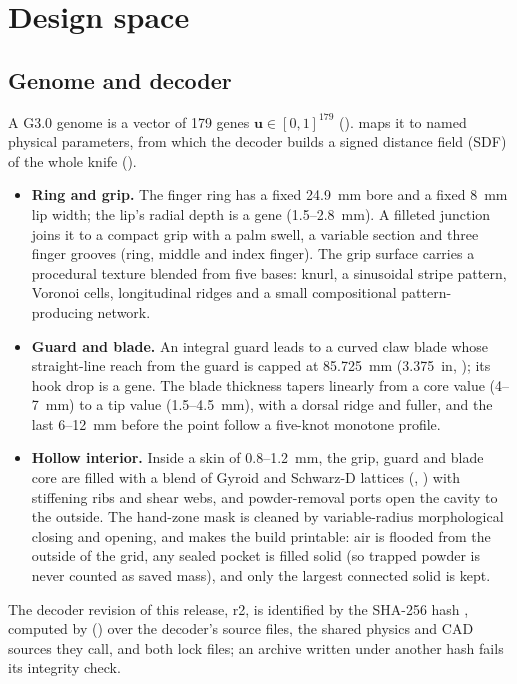 \section{Design space}\label{sec:design}
\subsection{Genome and decoder}
A G3.0 genome is a vector of 179 genes $\mathbf{u} \in [0,1]^{179}$
().  maps it to named physical parameters,
from which the decoder builds a signed distance field (SDF) of the whole knife
().
\begin{itemize}
\item \textbf{Ring and grip.} The finger ring has a fixed 24.9~mm bore and a fixed 8~mm lip width; the lip's radial
depth is a gene (1.5--2.8~mm). A filleted junction joins it to a compact grip with a palm swell, a variable section and
three finger grooves (ring, middle and index finger). The grip surface carries a procedural texture blended from five
bases: knurl, a sinusoidal stripe pattern, Voronoi cells, longitudinal ridges and a small compositional
pattern-producing network.
\item \textbf{Guard and blade.} An integral guard leads to a curved claw blade whose straight-line reach from the guard
is capped at 85.725~mm (3.375~in, ); its hook drop is a gene. The blade thickness tapers
linearly from a core value (4--7~mm) to a tip value (1.5--4.5~mm), with a dorsal ridge and fuller, and the last
6--12~mm before the point follow a five-knot monotone profile.
\item \textbf{Hollow interior.} Inside a skin of 0.8--1.2~mm, the grip, guard and blade core are filled with a blend of
Gyroid and Schwarz-D lattices (, ) with stiffening ribs and shear webs, and
powder-removal ports open the cavity to the outside. The hand-zone mask is cleaned by variable-radius morphological
closing and opening, and  makes the build printable: air is flooded from the outside of
the grid, any sealed pocket is filled solid (so trapped powder is never counted as saved mass), and only the largest
connected solid is kept.
\end{itemize}
The decoder revision of this release, r2, is identified by the SHA-256 hash \gDecoder{}, computed by
 () over the decoder's source files, the shared
physics and CAD sources they call, and both lock files; an archive written under another hash fails its integrity
check.

